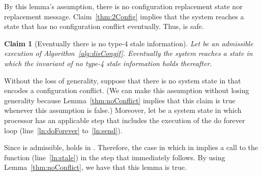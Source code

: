 \documentclass[11pt]{article}
\newtheorem{claim}[theorem]{Claim}
\newenvironment{proof}{\noindent{\bf Proof.}}{\hfill}
\begin{document}
\begin{proof}
By this lemma's assumption, there is no configuration  replacement state nor replacement message. Claim~\ref{thm:2Config} implies that the system reaches a state  that has no configuration conflict eventually. Thus,  is safe.   
\end{proof}









































\begin{claim}[Eventually there is no type-4 stale information]
\label{thm:noStale4}
Let  be an admissible execution of Algorithm~\ref{alg:disCongif}.
Eventually the system reaches a state  in which the invariant of no type-4 stale information holds thereafter.
\end{claim}
\begin{proof}
Without the loss of generality, suppose that there is no system state in  that encodes a configuration conflict. (We can make this assumption without losing generality because Lemma~\ref{thm:noConflict} implies that this claim is true whenever this assumption is false.) Moreover, let  be a system state in which processor  has an applicable step  that includes the execution of the do forever loop (line~\ref{ln:doForever} to~\ref{ln:send}). 

Since  is admissible, 
 holds in . Therefore, the case in which  in  implies a call  to the function  (line~\ref{ln:stale}) in the step that immediately follows. By using Lemma~\ref{thm:noConflict}, we have that this lemma is true.
\end{proof}
\end{document}
